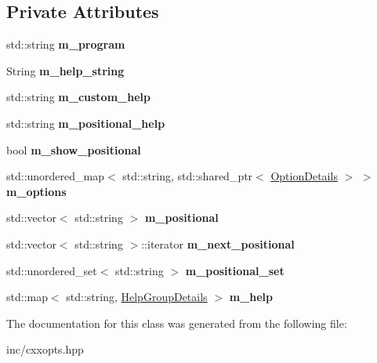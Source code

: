 \subsection*{Private Attributes}
\begin{DoxyCompactItemize}
\item 
std\+::string {\bfseries m\+\_\+program}\hypertarget{classcxxopts_1_1Options_a49f97b72bcc81357c9df0cbc657bb3a7}{}\label{classcxxopts_1_1Options_a49f97b72bcc81357c9df0cbc657bb3a7}

\item 
String {\bfseries m\+\_\+help\+\_\+string}\hypertarget{classcxxopts_1_1Options_a415a57d6ed9bac80126e1b9d5e8b800f}{}\label{classcxxopts_1_1Options_a415a57d6ed9bac80126e1b9d5e8b800f}

\item 
std\+::string {\bfseries m\+\_\+custom\+\_\+help}\hypertarget{classcxxopts_1_1Options_a32488bc1b1581d80b90a8a476fbeb1c4}{}\label{classcxxopts_1_1Options_a32488bc1b1581d80b90a8a476fbeb1c4}

\item 
std\+::string {\bfseries m\+\_\+positional\+\_\+help}\hypertarget{classcxxopts_1_1Options_ac5274870d676ae960f285a2e8f0dfdf6}{}\label{classcxxopts_1_1Options_ac5274870d676ae960f285a2e8f0dfdf6}

\item 
bool {\bfseries m\+\_\+show\+\_\+positional}\hypertarget{classcxxopts_1_1Options_ae0a47e72e50fc46543bc1bce186fe66a}{}\label{classcxxopts_1_1Options_ae0a47e72e50fc46543bc1bce186fe66a}

\item 
std\+::unordered\+\_\+map$<$ std\+::string, std\+::shared\+\_\+ptr$<$ \hyperlink{classcxxopts_1_1OptionDetails}{Option\+Details} $>$ $>$ {\bfseries m\+\_\+options}\hypertarget{classcxxopts_1_1Options_a15e9a6798dd7ae4b04fcb4abd8bc0584}{}\label{classcxxopts_1_1Options_a15e9a6798dd7ae4b04fcb4abd8bc0584}

\item 
std\+::vector$<$ std\+::string $>$ {\bfseries m\+\_\+positional}\hypertarget{classcxxopts_1_1Options_a2f7e42d87e511d25966cf48b504fa1f9}{}\label{classcxxopts_1_1Options_a2f7e42d87e511d25966cf48b504fa1f9}

\item 
std\+::vector$<$ std\+::string $>$\+::iterator {\bfseries m\+\_\+next\+\_\+positional}\hypertarget{classcxxopts_1_1Options_a221acec5dee5be22820c143699d0fd44}{}\label{classcxxopts_1_1Options_a221acec5dee5be22820c143699d0fd44}

\item 
std\+::unordered\+\_\+set$<$ std\+::string $>$ {\bfseries m\+\_\+positional\+\_\+set}\hypertarget{classcxxopts_1_1Options_ad9aeb1f3ce3755f6294442c419a414c1}{}\label{classcxxopts_1_1Options_ad9aeb1f3ce3755f6294442c419a414c1}

\item 
std\+::map$<$ std\+::string, \hyperlink{structcxxopts_1_1HelpGroupDetails}{Help\+Group\+Details} $>$ {\bfseries m\+\_\+help}\hypertarget{classcxxopts_1_1Options_a5df536e6ca2018564263e350c2ed8679}{}\label{classcxxopts_1_1Options_a5df536e6ca2018564263e350c2ed8679}

\end{DoxyCompactItemize}


The documentation for this class was generated from the following file\+:\begin{DoxyCompactItemize}
\item 
inc/cxxopts.\+hpp\end{DoxyCompactItemize}
